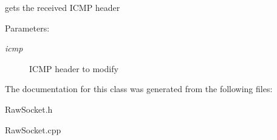 gets the received ICMP header 

\begin{Desc}
\item[Parameters:]
\begin{description}
\item[{\em icmp}]ICMP header to modify \end{description}
\end{Desc}


The documentation for this class was generated from the following files:\begin{CompactItemize}
\item 
RawSocket.h\item 
RawSocket.cpp\end{CompactItemize}
